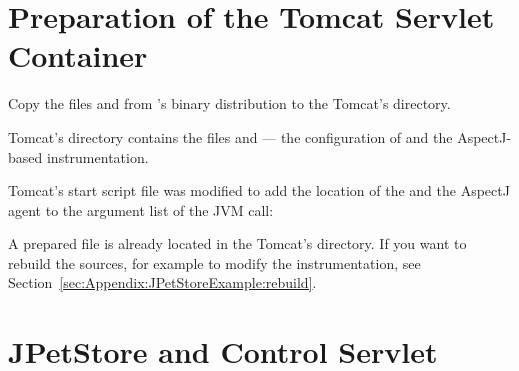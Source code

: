 \section{Preparation of the Tomcat Servlet Container}


\begin{compactenum}
\item Copy the files \file{\mainJar} and \file{\aspectJWeaverJar} from %
\Kieker{}'s binary distribution to the Tomcat's  directory.
\item Tomcat's  directory contains the files  %
and  --- the configuration of \KiekerMonitoringPart{} and the %
AspectJ-based instrumentation. %
\item
 Tomcat's start script  file was modified to add the location %
of the  and the AspectJ agent to the argument %
list of the JVM call:
\end{compactenum}

\enlargethispage{1cm}

% 
% 
% 


\begin{compactenum}\setcounter{enumi}{4}
\item  A prepared  file is already located in the %
   Tomcat's  directory. If you want to rebuild the sources, %
   for example to modify the instrumentation, see Section~\ref{sec:Appendix:JPetStoreExample:rebuild}. 
\end{compactenum}


\section{JPetStore and \KiekerMonitoringPart{} Control Servlet}

